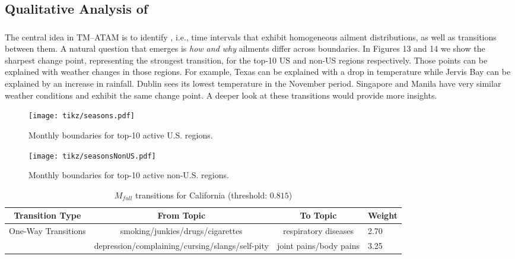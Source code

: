 \subsection{Qualitative Analysis of \tmatam}
\label{subsec:qualitative}
\subsubsection{\changes}
\label{subsubsec:season}
The central idea in TM–ATAM is to identify \changes, i.e.,
time intervals that exhibit homogeneous ailment distributions, as well
as transitions between them.
A natural question that emerges is {\em how and why} ailments
differ across \change boundaries. In Figures 13 and 14
we show the sharpest change point, representing the strongest
transition, for the top-10 US and
non-US regions respectively. Those points can be explained with weather
changes in those regions. For example, Texas can be explained with a
drop in temperature while Jervis Bay can be explained by an increase in
rainfall. Dublin sees its lowest temperature in the November period.
Singapore and Manila have very similar weather conditions and exhibit
the same change point. A deeper look at these transitions would provide
more insights.
\begin{figure}[b!]
\centering
\texttt{[image: tikz/seasons.pdf]}
\caption{Monthly \change boundaries for top-10  active U.S. regions.}
\label{fig:seasonBoundary:US}
\end{figure}
\begin{figure}[b!]
\centering
\texttt{[image: tikz/seasonsNonUS.pdf]}
\caption{Monthly \change boundaries for top-10 active non-U.S. regions.}
\label{fig:seasonBoundary:NonUS}
\end{figure}
\begin{table*}[t!]
\centering
\caption{$M_{full}$ transitions for California (threshold: $0.815$)}
\label{tab:fulltransitionCalifornia}
\begin{tabular}{|c|c|c|l|} \hline
Transition Type & From Topic&To Topic&Weight\\ \hline
One-Way Transitions & smoking/junkies/drugs/cigarettes & respiratory diseases&  2.70\\ 
 & depression/complaining/cursing/slangs/self-pity &  joint pains/body pains&  3.25\\
 \hline\end{tabular}
\end{table*}
